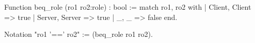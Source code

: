 Function beq_role (ro1 ro2:role) : bool :=
  match ro1, ro2 with
    | Client, Client => true
    | Server, Server => true                 
    | _, _           => false	
  end.

Notation "ro1 '==' ro2" := (beq_role ro1 ro2).